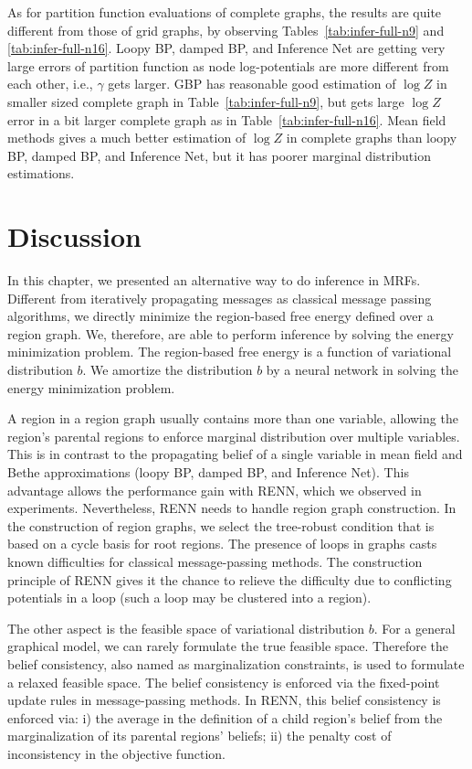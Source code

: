 As for partition function evaluations of complete graphs, the results are quite different from those of grid graphs, by observing Tables~\ref{tab:infer-full-n9} and \ref{tab:infer-full-n16}. Loopy BP, damped BP, and Inference Net are getting very large errors of partition function as node log-potentials are more different from each other, i.e., $\gamma$ gets larger. GBP has reasonable good estimation of $\log{Z}$ in smaller sized complete graph in Table~\ref{tab:infer-full-n9}, but gets large $\log{Z}$ error in a bit larger complete graph as in Table~\ref{tab:infer-full-n16}. Mean field methods gives a much better estimation of $\log{Z}$ in complete graphs than loopy BP, damped BP, and Inference Net, but it has poorer marginal distribution estimations.

\section{Discussion}
In this chapter, we presented an alternative way to do inference in MRFs. Different from iteratively propagating messages as classical message passing algorithms, we directly minimize the region-based free energy defined over a region graph. We, therefore, are able to perform inference by solving the energy minimization problem.
The region-based free energy is a function of variational distribution $b$. We amortize the distribution $b$ by a neural network in solving the energy minimization problem.

A region in a region graph usually contains more than one variable, allowing the region's parental regions to enforce marginal distribution over multiple variables. This is in contrast to the propagating belief of a single variable in mean field and Bethe approximations (loopy BP, damped BP, and Inference Net). This advantage allows the performance gain with RENN, which we observed in experiments. Nevertheless, RENN needs to handle region graph construction. In the construction of region graphs, we select the tree-robust condition that is based on a cycle basis for root regions. The presence of loops in graphs casts known difficulties for classical message-passing methods. The construction principle of RENN gives it the chance to relieve the difficulty due to conflicting potentials in a loop (such a loop may be clustered into a region).

The other aspect is the feasible space of variational distribution $b$. For a general graphical model, we can rarely formulate the true feasible space. Therefore the belief consistency, also named as marginalization constraints, is used to formulate a relaxed feasible space. The belief consistency is enforced via the fixed-point update rules in message-passing methods. In RENN, this belief consistency is enforced via: i) the average in the definition of a child region's belief from the marginalization of its parental regions' beliefs; ii) the penalty cost of inconsistency in the objective function. 

